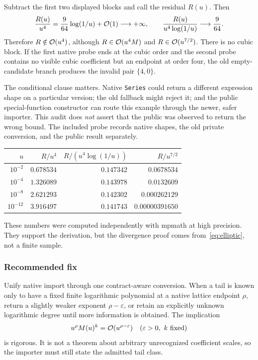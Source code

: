 Subtract the first two displayed blocks and call the residual $R(u)$. Then
\[
 \frac{R(u)}{u^4}
 =\frac9{64}\log(1/u)+\mathcal O(1)\longrightarrow+\infty,
 \qquad
 \frac{R(u)}{u^4\log(1/u)}\longrightarrow\frac9{64}.
\]
Therefore $R\notin\mathcal O(u^4)$, although $R\in\mathcal O(u^4M)$ and $R\in\mathcal O(u^{7/2})$. There is no cubic block. If the first native probe ends at the cubic order and the second probe contains no visible cubic coefficient but an endpoint at order four, the old empty-candidate branch produces the invalid pair $\{4,0\}$.

The conditional clause matters. Native \texttt{Series} could return a different expression shape on a particular version; the old fallback might reject it; and the public special-function constructor can route this example through the newer, safer importer. This audit does \emph{not} assert that the public  was observed to return the wrong bound. The included probe records native shapes, the old private conversion, and the public result separately.

\begin{center}
\begin{tabular}{@{}rrrr@{}}
\toprule $u$ & $R/u^4$ & $R/(u^4\log(1/u))$ & $R/u^{7/2}$\\\midrule
$10^{-2}$ & $0.678534$ & $0.147342$ & $0.0678534$\\
$10^{-4}$ & $1.326089$ & $0.143978$ & $0.0132609$\\
$10^{-8}$ & $2.621293$ & $0.142302$ & $0.000262129$\\
$10^{-12}$ & $3.916497$ & $0.141743$ & $0.00000391650$\\
\bottomrule
\end{tabular}
\end{center}
These numbers were computed independently with mpmath at high precision. They support the derivation, but the divergence proof comes from~\eqref{eq:elliptic}, not a finite sample.

\subsubsection*{Recommended fix}

Unify native import through one contract-aware conversion. When a tail is known only to have a fixed finite logarithmic polynomial at a native lattice endpoint $\rho$, return a slightly weaker exponent $\rho-\varepsilon$, or retain an explicitly unknown logarithmic degree until more information is obtained. The implication
\[
 u^\rho M(u)^k=\mathcal O(u^{\rho-\varepsilon})
 \quad(\varepsilon>0,\ k\ \text{fixed})
\]
is rigorous. It is not a theorem about arbitrary unrecognized coefficient scales, so the importer must still state the admitted tail class.

